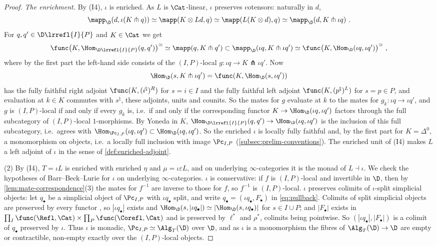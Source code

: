 \begin{proof}
\emph{The enrichment.}
By (I4), $\iota$ is enriched. As $L$ is $\Cat$-linear, $\iota$ preserves cotensors: naturally in $d$,
\[
\mapp_{\D}(d,\iota(K \pitchfork q)) \simeq \mapp(K \otimes Ld,q) \simeq \mapp(L(K \otimes d),q) \simeq \mapp_{\D}(d,K \pitchfork \iota q) \ .
\]
For $q,q' \in \D\lrrefl{I}{P}$ and $K \in \Cat$ we get
\[
\func\bigl(K,\Hom_{\D\lrrefl{I}{P}}(q,q')\bigr)^{\simeq} \simeq \mapp(q,K \pitchfork q') \subset \mapp_{\D}(\iota q,K \pitchfork \iota q') \simeq \func\bigl(K,\Hom_{\D}(\iota q,\iota q')\bigr)^{\simeq} \ ,
\]
where by the first part the left-hand side consists of the $(I,P)$-local $g\colon \iota q \to K \pitchfork \iota q'$.
Now
\[
\Hom_{\D}(s,K \pitchfork \iota q') = \func(K,\Hom_{\D}(s,\iota q'))
\]
has the fully faithful right adjoint $\func(K,(i^{\natural})^{R})$ for $s = i \in I$ and the fully faithful left adjoint $\func(K,(p^{\natural})^{L})$ for $s = p \in P$, and evaluation at $k \in K$ commutes with $s^{\natural}$, these adjoints, units and counits. So the mates for $g$ evaluate at $k$ to the mates for $g_{k}\colon \iota q \to \iota q'$, and $g$ is $(I,P)$-local if and only if every $g_{k}$ is, i.e.\ if and only if the corresponding functor $K \to \Hom_{\D}(\iota q,\iota q')$ factors through the full subcategory of $(I,P)$-local $1$-morphisms. By Yoneda in $K$, $\Hom_{\D\lrrefl{I}{P}}(q,q') \to \Hom_{\D}(\iota q,\iota q')$ is the inclusion of this full subcategory, i.e.\ agrees with $\Hom_{\Pc_{I,P}}(\iota q,\iota q') \subset \Hom_{\D}(\iota q,\iota q')$.
So the enriched $\iota$ is locally fully faithful and, by the first part for $K = \Delta^{0}$, a monomorphism on objects, i.e.\ a locally full inclusion with image $\Pc_{I,P}$ (\cref{subsec:prelim-conventions}). The enriched unit of (I4) makes $L$ a left adjoint of $\iota$ in the sense of \cref{def:enriched-adjoint}.

(2) By (I4), $T = \iota L$ is enriched with enriched $\eta$ and $\mu = \iota\varepsilon L$, and on underlying $\infty$-categories it is the monad of $L \dashv \iota$.
We check the hypotheses of Barr--Beck--Lurie \cite[4.7.3.5]{ha} for $\iota$ on underlying $\infty$-categories.
$\iota$ is conservative: if $f$ is $(I,P)$-local and invertible in $\D$, then by \cref{lem:mate-correspondence}(3) the mates for $f^{-1}$ are inverse to those for $f$, so $f^{-1}$ is $(I,P)$-local.
$\iota$ preserves colimits of $\iota$-split simplicial objects: let $q_{\bullet}$ be a simplicial object of $\Pc_{I,P}$ with $\iota q_{\bullet}$ split, and write $q_{\bullet} = (\iota q_{\bullet},F_{\bullet})$ in \eqref{eq:pullback}. Colimits of split simplicial objects are preserved by every functor \cite[6.1.3.16]{htt}, so $|\iota q_{\bullet}|$ exists and $\Hom_{\D}(s,|\iota q_{\bullet}|) \simeq |\Hom_{\D}(s,\iota q_{\bullet})|$ for $s \in I \cup P$; and $|F_{\bullet}|$ exists in $\prod_{I}\func(\Refl,\Cat) \times \prod_{P}\func(\Corefl,\Cat)$ and is preserved by $\ell^{*}$ and $\rho^{*}$, colimits being pointwise. So $(|\iota q_{\bullet}|,|F_{\bullet}|)$ is a colimit of $q_{\bullet}$ preserved by $\iota$.
Thus $\iota$ is monadic, $\Pc_{I,P} \simeq \Alg_{T}(\D)$ over $\D$, and as $\iota$ is a monomorphism the fibres of $\Alg_{T}(\D) \to \D$ are empty or contractible, non-empty exactly over the $(I,P)$-local objects.
\end{proof}

